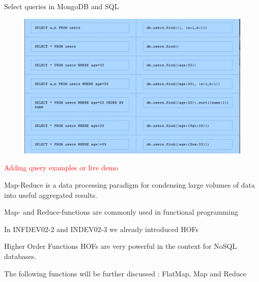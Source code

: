 \documentclass{beamer}
\newcommand{\red}[1]{
\textcolor{red}{#1}
}
\begin{document}
\begin{slide}{
\item Select queries in MongoDB and SQL 
\begin{figure}
		\includegraphics[scale=0.23]{img/mongo-query}
\end{figure}
}\end{slide}

\begin{slide}{
\item \red{Adding query examples or live demo}
}\end{slide}

\begin{slide}{
\item Map-Reduce is a data processing paradigm for condensing large volumes of data into useful aggregated results.
\item Map- and Reduce-functions are commonly used in functional programming   
\item In INFDEV02-2 and INDEV02-3 we already introduced HOFs
\item Higher Order Functions HOFs are very powerful in the context for NoSQL databases. 
\item The following functions will be further discussed : FlatMap, Map and Reduce 
}\end{slide}
\end{document}
